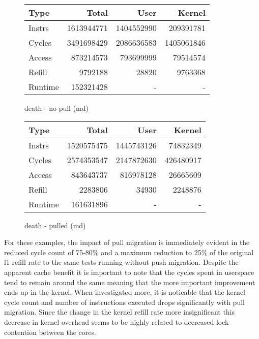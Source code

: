 \documentclass[11pt]{article}
\begin{document}
\begin{figure*}[h]
	\begin{subtable}{.48\textwidth}
		\centering                 
		\begin{tabular}{l|rrr}       
			Type    & Total      & User       & Kernel     \\
			\hline
			Instrs  & 1613944771 & 1404552990 & 209391781  \\ 
			Cycles  & 3491698429 & 2086636583 & 1405061846 \\ 
			Access  & 873214573  & 793699999  & 79514574   \\ 
			Refill  & 9792188    & 28820      & 9763368    \\ 
			Runtime & 152321428  & -          & -          \\ 
			\hline
		\end{tabular}
		\caption{death - no pull (md)}
	\end{subtable}
	\hfill
	\begin{subtable}{.48\textwidth}
		\centering                 
		\begin{tabular}{l|rrr}  
			Type    & Total      & User       & Kernel    \\
			\hline
			Instrs  & 1520575475 & 1445743126 & 74832349  \\ 
			Cycles  & 2574353547 & 2147872630 & 426480917 \\ 
			Access  & 843643737  & 816978128  & 26665609  \\ 
			Refill  & 2283806    & 34930      & 2248876   \\ 
			Runtime & 161631896  & -          & -         \\ 
			\hline
		\end{tabular}
		\caption{death - pulled (md)}        
	\end{subtable}
\end{figure*}



For these examples, the impact of pull migration is immediately evident in the reduced cycle count of 75-80\% and a maximum reduction to 25\% of the original l1 refill rate to the same tests running without push migration.  Despite the apparent cache benefit it is important to note that the cycles spent in userspace tend to remain around the same meaning that the more important improvement ends up in the kernel.  When investigated more, it is noticable that the kernel cycle count and number of instructions executed drops significantly with pull migration.  Since the change in the kernel refill rate more insignificant this decrease in kernel overhead seems to be highly related to decreased lock contention between the cores.
\end{document}
